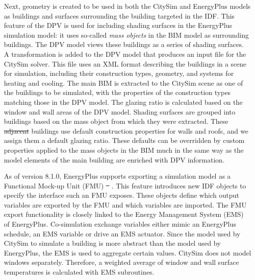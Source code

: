 \documentclass{tBPS2e}
\theoremstyle{plain}
\theoremstyle{definition}
\theoremstyle{remark}
\newcommand{\noteDT}[1]{\footnote{\textcolor{green}{#1}}}
\providecommand{\DIFadd}[1]{{\protect\color{blue}\uwave{#1}}} %
\providecommand{\DIFdel}[1]{{\protect\color{red}\sout{#1}}}                      %
\providecommand{\DIFaddbegin}{} %
\providecommand{\DIFaddend}{} %
\providecommand{\DIFdelbegin}{} %
\providecommand{\DIFdelend}{} %
\begin{document}
Next, geometry is created to be used in both the CitySim and EnergyPlus models
as buildings and surfaces surrounding the building targeted in the IDF. This
feature of the DPV is used for including shading surfaces in the EnergyPlus
simulation model: it uses so-called \emph{mass objects} in the BIM model as
surrounding buildings. The DPV model views these buildings as a series of
shading surfaces. A transformation is added to the DPV model that produces an
input file for the CitySim solver. This file uses an XML format describing the
buildings in a scene for simulation, including their construction types,
geometry, and systems for heating and cooling. The main BIM is extracted to the
CitySim scene as one of the buildings to be simulated, with the properties of
the construction types matching those in the DPV model. The glazing ratio is
calculated based on the window and wall areas of the DPV model. Shading
surfaces are grouped into buildings based on the mass object from which they were extracted. These \DIFdelbegin \DIFdel{adjacent }\DIFdelend \DIFaddbegin \DIFadd{neighboring }\DIFaddend buildings use default construction properties for walls and roofs, and we assign them a default glazing ratio.
These defaults can be overridden by custom properties applied to the mass
objects in the BIM much in the same way as the model elements of the main
building are enriched with DPV information.

As of version 8.1.0, EnergyPlus supports exporting a simulation model as a
Functional Mock-up Unit (FMU) \DIFdelbegin \DIFdel{\mbox{%
\citep{nouidui_functional_2014}}%
}\DIFdelend \DIFaddbegin \DIFadd{\mbox{%
\citep{Nouidui:2014hq,Anonymous:ZZTfF80-}}%
}\DIFaddend . This
feature introduces new IDF objects to specify the interface such an FMU
exposes. These objects define which output variables are exported by the FMU
and which variables are imported. The FMU export functionality is closely
linked to the Energy Management System (EMS) of EnergyPlus. Co-simulation
exchange variables either mimic an EnergyPlus schedule, an EMS variable or
drive an EMS actuator. Since the model used by CitySim to simulate a building
is more abstract than the model used by EnergyPlus, the EMS is used to
aggregate certain values. CitySim does not model windows separately. Therefore,
a weighted average of window and wall surface temperatures is calculated with
EMS subroutines.

\end{document}
